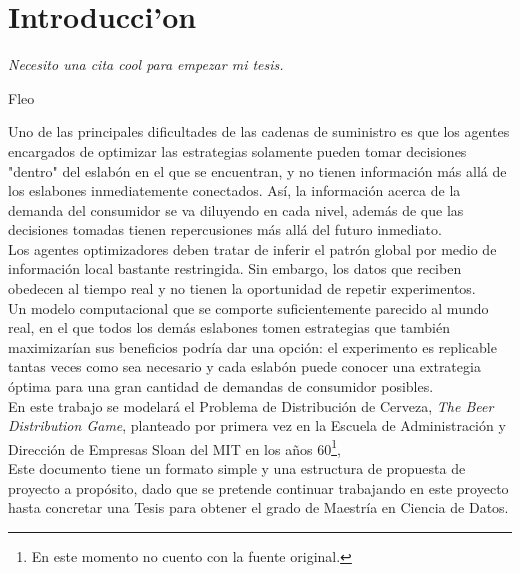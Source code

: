 \chapter{Introducci'on}

\textit{Necesito una cita cool para empezar mi tesis.}
\begin{flushright}
 Fleo
 \end{flushright}

\vspace{10 pt}





Uno de las principales dificultades de las cadenas de suministro es que los agentes encargados de optimizar las estrategias solamente pueden tomar decisiones "dentro" del eslabón en el que se encuentran, y no tienen información más allá de los eslabones inmediatemente conectados. Así, la información acerca de la demanda del consumidor se va diluyendo en cada nivel, además de que las decisiones tomadas tienen repercusiones más allá del futuro inmediato. \\

Los agentes optimizadores deben tratar de inferir el patrón global por medio de información local bastante restringida. Sin embargo, los datos que reciben obedecen al tiempo real y no tienen la oportunidad de repetir experimentos.\\

Un modelo computacional que se comporte suficientemente parecido al mundo real, en el que todos los demás eslabones tomen estrategias que también maximizarían sus beneficios podría dar una opción: el experimento es replicable tantas veces como sea necesario y cada eslabón puede conocer una extrategia óptima para una gran cantidad de demandas de consumidor posibles.\\

En este trabajo se modelará el Problema de Distribución de Cerveza, \textit{The Beer Distribution Game}, planteado por primera vez en la Escuela de Administraci\'on y Direcci\'on de Empresas Sloan del MIT en los años 60\footnote{En este momento no cuento con la fuente original.}, \\

Este documento tiene un formato simple y una estructura de propuesta de proyecto a propósito, dado que se pretende continuar trabajando en este proyecto hasta concretar una Tesis para obtener el grado de Maestría en Ciencia de Datos.